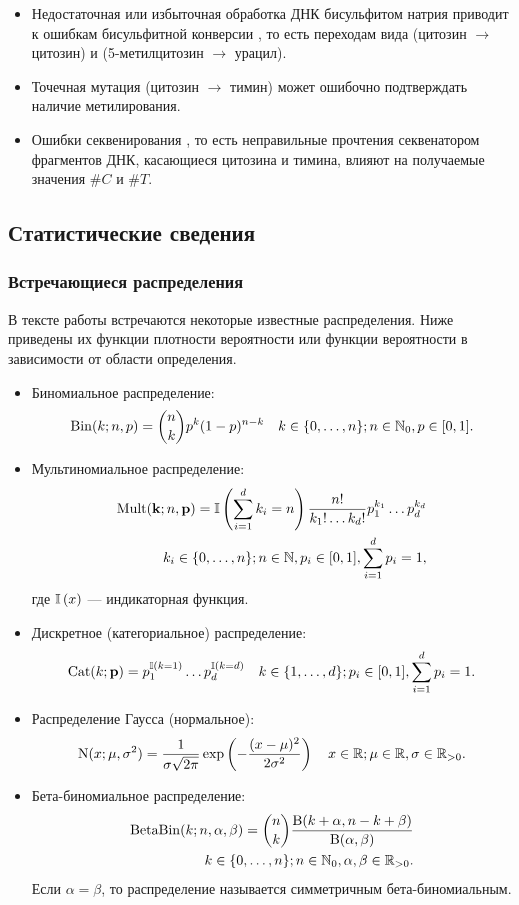 \begin{itemize}
\item Недостаточная или избыточная обработка ДНК бисульфитом натрия приводит к
  ошибкам бисульфитной конверсии \cite{pmid18984622}, то есть переходам вида
  (цитозин $\rightarrow$ цитозин) и (5-метилцитозин $\rightarrow$ урацил).
\item Точечная мутация (цитозин $\rightarrow$ тимин) может ошибочно подтверждать наличие
  метилирования.
\item Ошибки секвенирования \cite{pmid22067484}, то есть неправильные прочтения секвенатором
  фрагментов ДНК, касающиеся цитозина и тимина, влияют на получаемые значения $\#C$ и $\#T$.
\end{itemize}

\subsection{Статистические сведения}

\subsubsection{Встречающиеся распределения}
\label{subsub:mentioned}

В тексте работы встречаются некоторые известные \cite{murphy2012machine} распределения. Ниже
приведены их функции плотности вероятности или функции вероятности в зависимости от области
определения.
\begin{itemize}
\item Биномиальное распределение:
  $$
  \operatorname{Bin}(k; n, p) = \binom{n}{k} p^k (1 - p)^{n - k}
  \quad k \in \{0, \ldots, n\}; n \in \mathbb{N}_0, p \in [0, 1].
  $$
\item Мультиномиальное распределение:
  \begin{align*}
    \operatorname{Mult}(\mathbf{k}; n, \mathbf{p})
    = \mathbb{I}\left( \sum_{i = 1}^d k_i = n \right) \frac{n!}{k_1! \dots k_d!} p_1^{k_1} \dots p_d^{k_d} \\
    k_i \in \{0, \ldots, n\}; n \in \mathbb{N}, p_i \in [0, 1], \sum\limits_{i = 1}^d p_i = 1,
  \end{align*}
  где $\mathbb{I}\left( x \right)$ --- индикаторная функция.
\item Дискретное (категориальное) распределение:
  $$
  \operatorname{Cat}(k; \mathbf{p}) = p_1^{\mathbb{I}\left( k = 1 \right)} \dots p_d^{\mathbb{I}\left( k = d \right)}
  \quad k \in \{1, \ldots, d\}; p_i \in [0, 1], \sum\limits_{i = 1}^d p_i = 1.
  $$
\item Распределение Гаусса (нормальное):
  $$
  \operatorname{N}(x; \mu, \sigma^2)
  = \frac{1}{\sigma \sqrt{2 \pi}} \exp \left( - \frac{(x - \mu)^2}{2 \sigma^2} \right)
  \quad x \in \mathbb{R}; \mu \in \mathbb{R}, \sigma \in \mathbb{R}_{> 0}.
  $$
\item Бета-биномиальное распределение:
  \begin{align*}
  \operatorname{BetaBin}(k; n, \alpha, \beta)
  = \binom{n}{k} \frac{\operatorname{B}(k + \alpha, n - k + \beta)}{\operatorname{B}(\alpha, \beta)} \\
  k \in \{0, \ldots, n\}; n \in \mathbb{N}_0, \alpha, \beta \in \mathbb{R}_{> 0}.
  \end{align*}
  Если $\alpha = \beta$, то распределение называется симметричным бета\hyp биномиальным.
\end{itemize}

